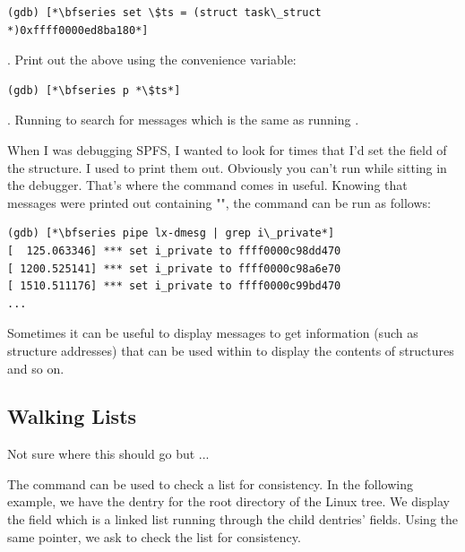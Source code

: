 \begin{lstlisting}
(gdb) [*\bfseries set \$ts = (struct task\_struct *)0xffff0000ed8ba180*]
\end{lstlisting}

. Print out the above  using the convenience variable:

\begin{lstlisting}
(gdb) [*\bfseries p *\$ts*]
\end{lstlisting}

. Running  to search for messages which is the same as running .

\bigskip
\noindent
When I was debugging SPFS, I wanted to look for times that I'd set the  field of the  structure. I used  to print them out. Obviously you can't run  while sitting in the debugger. That's where the  command comes in useful. Knowing that messages were printed out containing "", the  command can be run as follows:

\begin{lstlisting}
(gdb) [*\bfseries pipe lx-dmesg | grep i\_private*]
[  125.063346] *** set i_private to ffff0000c98dd470
[ 1200.525141] *** set i_private to ffff0000c98a6e70
[ 1510.511176] *** set i_private to ffff0000c99bd470
...
\end{lstlisting}

\noindent
Sometimes it can be useful to display messages to get information (such as structure addresses) that can be used within  to display the contents of structures and so on.


\subsection{Walking Lists}

Not sure where this should go but ...

The  command can be used to check a list for consistency. In the following example, we have the dentry for the root directory of the Linux tree. We display the  field which is a linked list running through the child dentries'  fields. Using the same pointer, we ask  to check the list for consistency.

